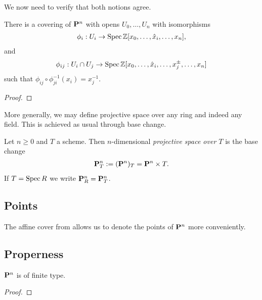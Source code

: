 \documentclass{article}
\begin{document}
We now need to verify that both notions agree.

\begin{lemma}\label{lem:affine_cover}
  There is a covering of $\mathbf{P}^{n}_{}$ with opens
  $U_0,\ldots,U_n$ with isomorphisms
  \begin{align*}
    \phi_i : U_i \to \operatorname{Spec}\mathbb{Z}[x_0,\ldots,\hat x_i,\ldots,x_n],
  \end{align*}
  and
  \begin{align*}
    \phi_{ij} : U_i \cap U_j \to \operatorname{Spec}\mathbb{Z}[x_0,\ldots,\hat x_i,\ldots,x_j^\pm,\ldots,x_n]
  \end{align*}
  such that $\phi_{ij}\circ{\phi}^{-1}_{ji}(x_i) = {x}^{-1}_j$.
  \begin{proof}
    \missingproof
  \end{proof}
\end{lemma}

More generally, we may define projective space over any ring and
indeed any field. This is achieved as usual through base change.

\begin{definition}
  Let $n\geq 0$ and $T$ a scheme. Then $n$-dimensional
  \emph{projective space over $T$} is the base change
  \begin{align*}
    \mathbf{P}^{n}_{T} := (\mathbf{P}^{n}_{})_T = \mathbf{P}^{n}_{}\times T.
  \end{align*}
  If $T=\operatorname{Spec} R$ we write $\mathbf{P}^{n}_{R}=\mathbf{P}^{n}_{T}$.
\end{definition}

\subsection{Points}

The affine cover from \label{lem:affine_cover} allows us to denote the
points of $\mathbf{P}^{n}_{}$ more conveniently.

\subsection{Properness}

\begin{lemma}
  $\mathbf{P}^{n}_{}$ is of finite type.
  \begin{proof}
    \missingproof
  \end{proof}
\end{lemma}
\end{document}
